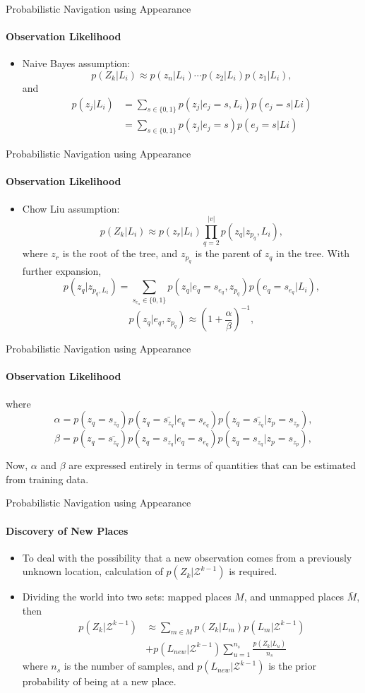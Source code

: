 \documentclass[dvipsnames, handout]{beamer}
\newcommand{\1}{\mathds{1}}	%
\begin{document}
\begin{frame}[t]{Probabilistic Navigation using Appearance}
\framesubtitle{Observation Likelihood}
\begin{itemize}
\item Naive Bayes assumption: 
\[p(Z_k|L_i) \approx p(z_n|L_i)\cdots p(z_2|L_i)p(z_1|L_i),\]
and 
\begin{align*}
p(z_j|L_i) &= \sum_{s\in\{0,1\}} p(z_j|e_j=s, L_i)p(e_j=s|Li)\\
& =  \sum_{s\in\{0,1\}} p(z_j|e_j=s)p(e_j=s|Li)
\end{align*}
\end{itemize}
\end{frame}

\begin{frame}[t]{Probabilistic Navigation using Appearance}
\framesubtitle{Observation Likelihood}
\begin{itemize}
\item Chow Liu assumption: 
\[p(Z_k|L_i) \approx p(z_r|L_i)\prod_{q=2}^{|v|} p(z_q|z_{p_q},L_i),\]
where $z_r$ is the root of the tree, and $z_{p_q}$ is the parent of $z_q$ in the tree. With further expansion,
\[p(z_q|z_{p_q, L_i})  = \sum_{s_{e_a} \in \{0,1\}} p(z_q|e_q=s_{e_q}, z_{p_q})p(e_q=s_{e_q}|L_i),\]
\[p(z_q|e_q,z_{p_q}) \approx \left(1+\frac{\alpha}{\beta}\right)^{-1},\]

\end{itemize}
\end{frame}

\begin{frame}[t]{Probabilistic Navigation using Appearance}
\framesubtitle{Observation Likelihood}
where 
\[\alpha = p(z_q=s_{z_q})p(z_q=\bar{s_{z_q}}|e_q=s_{e_q})p(z_q=\bar{s_{z_q}}|z_p=s_{z_p}),\]
\[\beta = p(z_q=\bar{s_{z_q}})p(z_q=s_{z_q}|e_q=s_{e_q})p(z_q=s_{z_q}|z_p=s_{z_p}),\]

Now, $\alpha$ and $\beta$ are expressed entirely in terms of quantities that can be estimated from training data. 
\end{frame}


\begin{frame}[t]{Probabilistic Navigation using Appearance}
\framesubtitle{Discovery of New Places}
\begin{itemize}
\item To deal with the possibility that a new observation comes from a previously unknown location, calculation of $p(Z_k|\mathcal{Z}^{k-1})$ is required.
\item Dividing the world into two sets: mapped places $M$, and unmapped places $\bar{M}$, then
\begin{align*}
p(Z_k|\mathcal{Z}^{k-1}) &\approx \sum_{m\in M} p(Z_k|L_m)p(L_m|\mathcal{Z}^{k-1})\\ 
&+ p(L_{new}|\mathcal{Z}^{k-1})\sum_{u=1}^{n_s}\frac{p(Z_k|L_u)}{n_s}
\end{align*}
where $n_s$ is the number of samples, and $p(L_{new}|\mathcal{Z}^{k-1})$ is the prior probability of being at a new place.
\end{itemize}
\end{frame}
\end{document}
